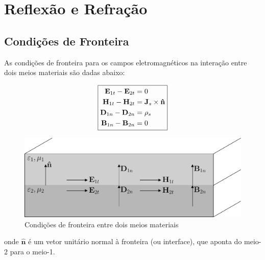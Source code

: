 \clearpage
\section{Reflexão e Refração}

\subsection{Condições de Fronteira}
\label{sec:boundary-conditions-waves}

As condições de fronteira para os campos eletromagnéticos na interação entre dois meios materiais são dadas abaixo:

\begin{figure}[H]
    \centering
    \begin{minipage}[c]{0.25\linewidth}
        $$
            \boxed{%
                \begin{aligned}
                    \mathbf{E}_{1t} - \mathbf{E}_{2t} &= 0 \\
                    \mathbf{H}_{1t} - \mathbf{H}_{2t} &= \mathbf{J}_{s} \times \mathbf{\hat{n}} \\
                    \mathbf{D}_{1n} - \mathbf{D}_{2n} &= \rho_{s} \\
                    \mathbf{B}_{1n} - \mathbf{B}_{2n} &= 0
                \end{aligned}
            }
        $$
    \end{minipage}\hspace{1em}
    \begin{minipage}[c]{0.55\linewidth}
        \includegraphics[width=0.925\linewidth]{img/1/Material-interface.pdf}
    \end{minipage}
    \caption{Condições de fronteira entre dois meios materiais}
    \label{fig:Material-interface}
\end{figure}

\vspace{-1em}
onde $\mathbf{\hat{n}}$ é um vetor unitário normal à fronteira (ou interface), que aponta do meio-2 para o meio-1.

